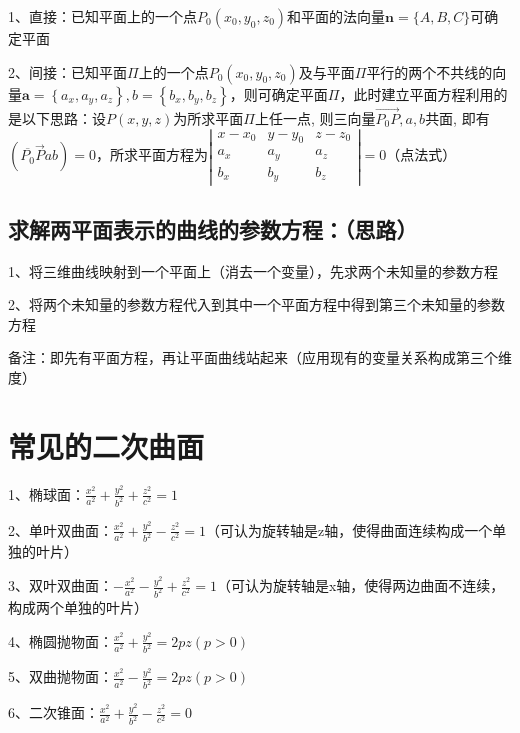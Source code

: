 1、直接：已知平面上的一个点$P_{0}\left(x_{0}, y_{0}, z_{0}\right)$和平面的法向量$\boldsymbol{n}=\{A, B, C\}$可确定平面

2、间接：已知平面$\Pi$上的一个点$P_{0}\left(x_{0}, y_{0}, z_{0}\right)$及与平面$\Pi$平行的两个不共线的向量$\boldsymbol{a}=\left\{a_{x}\right., \left.a_{y}, a_{z}\right\}, b=\left\{b_{x}, b_{y}, b_{z}\right\}$，则可确定平面$\Pi$，此时建立平面方程利用的是以下思路：设$P(x, y, z)$为所求平面$\Pi$上任一点, 则三向量$\overrightarrow{P_{0} P}, a, b$共面, 即有$\left(\overline{P_{0}} \vec{P} a b\right)=0$，所求平面方程为$\left|\begin{array}{ccc} x-x_{0} & y-y_{0} & z-z_{0} \\ a_{x} & a_{y} & a_{z} \\ b_{x} & b_{y} & b_{z} \end{array}\right|=0$（点法式）



\subsection{求解两平面表示的曲线的参数方程：（思路）}

1、将三维曲线映射到一个平面上（消去一个变量），先求两个未知量的参数方程

2、将两个未知量的参数方程代入到其中一个平面方程中得到第三个未知量的参数方程

备注：即先有平面方程，再让平面曲线站起来（应用现有的变量关系构成第三个维度）



\section{常见的二次曲面}

1、椭球面：$\frac{x^{2}}{a^{2}}+\frac{y^{2}}{b^{2}}+\frac{z^{2}}{c^{2}}=1$

2、单叶双曲面：$\frac{x^{2}}{a^{2}}+\frac{y^{2}}{b^{2}}-\frac{z^{2}}{c^{2}}=1$（可认为旋转轴是z轴，使得曲面连续构成一个单独的叶片）

3、双叶双曲面：$-\frac{x^{2}}{a^{2}}-\frac{y^{2}}{b^{2}}+\frac{z^{2}}{c^{2}}=1$（可认为旋转轴是x轴，使得两边曲面不连续，构成两个单独的叶片）

4、椭圆抛物面：$\frac{x^{2}}{a^{2}}+\frac{y^{2}}{b^{2}}=2 p z(p>0)$

5、双曲抛物面：$\frac{x^{2}}{a^{2}}-\frac{y^{2}}{b^{2}}=2 p z(p>0)$

6、二次锥面：$\frac{x^{2}}{a^{2}}+\frac{y^{2}}{b^{2}}-\frac{z^{2}}{c^{2}}=0$


